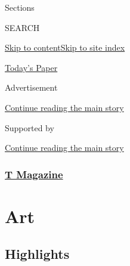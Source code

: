 Sections

SEARCH

\protect\hyperlink{site-content}{Skip to
content}\protect\hyperlink{site-index}{Skip to site index}

\href{https://myaccount.nytimes.com/auth/login?response_type=cookie\&client_id=vi}{}

\href{https://www.nytimes.com/section/todayspaper}{Today's Paper}

Advertisement

\protect\hyperlink{after-top}{Continue reading the main story}

Supported by

\protect\hyperlink{after-sponsor}{Continue reading the main story}

\hypertarget{t-magazine}{%
\subsubsection{\texorpdfstring{\href{/section/t-magazine}{T
Magazine}}{T Magazine}}\label{t-magazine}}

\hypertarget{art}{%
\section{Art}\label{art}}

\hypertarget{highlights}{%
\subsection{Highlights}\label{highlights}}

